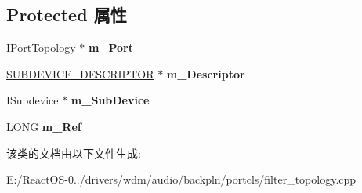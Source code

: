 \subsection*{Protected 属性}
\begin{DoxyCompactItemize}
\item 
\mbox{\label{class_c_port_filter_topology_ac3400674593520a36ec46dbe13ff5805}} 
I\+Port\+Topology $\ast$ {\bfseries m\+\_\+\+Port}
\item 
\mbox{\label{class_c_port_filter_topology_a53fa1ce68fca02f5678e720160322e0a}} 
\hyperlink{struct_s_u_b_d_e_v_i_c_e___d_e_s_c_r_i_p_t_o_r}{S\+U\+B\+D\+E\+V\+I\+C\+E\+\_\+\+D\+E\+S\+C\+R\+I\+P\+T\+OR} $\ast$ {\bfseries m\+\_\+\+Descriptor}
\item 
\mbox{\label{class_c_port_filter_topology_ab777a35d2763cf9ffe18b42c358bed8b}} 
I\+Subdevice $\ast$ {\bfseries m\+\_\+\+Sub\+Device}
\item 
\mbox{\label{class_c_port_filter_topology_a1615c73cea99026717cf679e81074879}} 
L\+O\+NG {\bfseries m\+\_\+\+Ref}
\end{DoxyCompactItemize}


该类的文档由以下文件生成\+:\begin{DoxyCompactItemize}
\item 
E\+:/\+React\+O\+S-\/0../drivers/wdm/audio/backpln/portcls/filter\+\_\+topology.\+cpp\end{DoxyCompactItemize}
